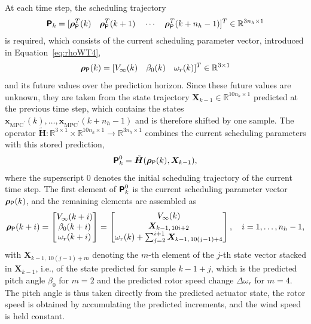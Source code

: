 At each time step, the scheduling trajectory
\begin{align*}
    \bm{\mathsf{P}}_{k} = [\bm{\rho}_{\mathsf{P}}^T(k) \quad \bm{\rho}_{\mathsf{P}}^T(k+1) \quad \cdots \quad \bm{\rho}_{\mathsf{P}}^T(k+n_h-1)]^T \in \mathbb{R}^{3n_h \times 1}
\end{align*}
is required, which consists of the current scheduling parameter vector, introduced in Equation~\eqref{eq:rhoWT4},
\begin{align*}
    \bm{\rho}_{\mathsf{P}}(k) = [V_\infty(k) \quad \beta_0(k) \quad \omega_r(k)]^T \in \mathbb{R}^{3 \times 1}
\end{align*}
and its future values over the prediction horizon. Since these future values are unknown, they are taken from the state trajectory $\bm{X}_{k-1} \in \mathbb{R}^{10 n_h \times 1}$ predicted at the previous time step, which contains the states $\bm{x}_{\text{MPC}^\prime}(k), \dots, \bm{x}_{\text{MPC}^\prime}(k+n_h-1)$ and is therefore shifted by one sample. The operator $\tilde{\bm{H}}: \mathbb{R}^{3 \times 1} \times \mathbb{R}^{10 n_h \times 1} \to \mathbb{R}^{3 n_h \times 1}$ combines the current scheduling parameters with this stored prediction,
\begin{align*}
    \bm{\mathsf{P}}_k^0 = \tilde{\bm{H}}(\bm{\rho}_{\mathsf{P}}(k), \bm{X}_{k-1}),
\end{align*}
where the superscript $0$ denotes the initial scheduling trajectory of the current time step. The first element of $\bm{\mathsf{P}}_k^0$ is the current scheduling parameter vector $\bm{\rho}_{\mathsf{P}}(k)$, and the remaining elements are assembled as
\begin{align*}
    \bm{\rho}_{\mathsf{P}}(k+i) = \begin{bmatrix}
        V_\infty(k+i) \\
        \beta_{0}(k+i) \\
        \omega_r(k+i)
    \end{bmatrix} = \begin{bmatrix}
        V_\infty(k) \\
        \bm{X}_{k-1,\,10i+2} \\
        \omega_r(k) + \sum_{j=2}^{i+1} \bm{X}_{k-1,\,10(j-1)+4}
    \end{bmatrix}, \quad i = 1, \dots, n_h-1,
\end{align*}
with $\bm{X}_{k-1,\,10(j-1)+m}$ denoting the $m$-th element of the $j$-th state vector stacked in $\bm{X}_{k-1}$, i.e., of the state predicted for sample $k-1+j$, which is the predicted pitch angle $\beta_0$ for $m = 2$ and the predicted rotor speed change $\Delta\omega_r$ for $m = 4$. The pitch angle is thus taken directly from the predicted actuator state, the rotor speed is obtained by accumulating the predicted increments, and the wind speed is held constant.

